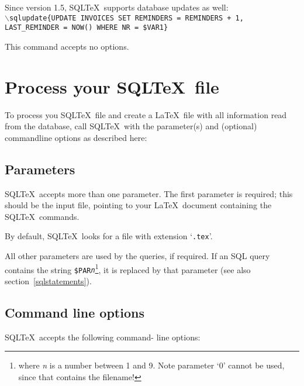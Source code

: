 \documentclass{article}
\newcommand{\bs}{\ensuremath{\backslash}}
\newcommand{\vs}{\vspace{3mm}}
\begin{document}
Since version 1.5, SQL\TeX\ supports database updates as well: \\
\texttt{\bs sqlupdate\{UPDATE INVOICES SET REMINDERS = REMINDERS + 1,
LAST\_REMINDER = NOW() WHERE NR = \$VAR1\}}

\vs

This command accepts no options.

\section{Process your SQL\TeX\ file}

To process you SQL\TeX\ file and create a \LaTeX\ file with all information read from
the database, call SQL\TeX\ with the parameter(s) and (optional) command\-line options as
described here:

\subsection{Parameters}\label{params}

SQL\TeX\ accepts more than one parameter. The first parameter is required; this should
be the input file, pointing to your \LaTeX\ document containing the SQL\TeX\ commands.

By default, SQL\TeX\ looks for a file with extension `\texttt{.tex}'.

\vs

All other parameters are used by the queries, if required. If an SQL query contains the
string \texttt{\$PAR\textit{n}}\footnote{where \textit{n} is a number between 1 and 9. Note 
parameter `0' cannot be used, since that contains the filename!}, it is replaced by that parameter
(see also section~\ref{sqlstatements}).

\subsection{Command line options}\label{cmdline}

SQL\TeX\ accepts the following command- line options:
\end{document}
